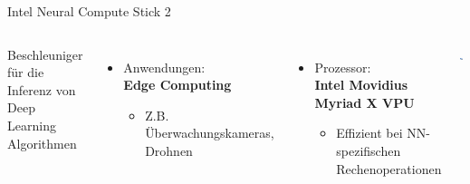 \begin{frame}{Intel Neural Compute Stick 2}
    \begin{columns}[T]
        Beschleuniger für die Inferenz von Deep Learning Algorithmen
        \vspace{0.3cm}

        \begin{itemize}
            \item Anwendungen:\\\textbf{Edge Computing}
            \begin{itemize}
                \item Z.B. Überwachungskameras, Drohnen
            \end{itemize}
        \end{itemize}

        \begin{itemize}    
            \item Prozessor:\\\textbf{Intel Movidius Myriad X VPU}
            \begin{itemize}
                \item Effizient bei NN-spezifischen Rechenoperationen
            \end{itemize}    
        \end{itemize}
        
        \vspace{1cm}
        \includegraphics[width=0.8\textwidth]{Bilder/ncs2.jpg}
    \end{columns}



    

\end{frame}
